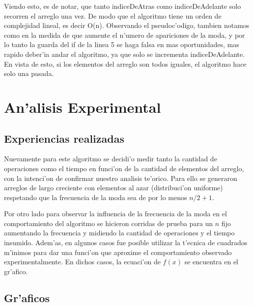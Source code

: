 Viendo esto, es de notar, que tanto indiceDeAtras como indiceDeAdelante solo recorren el arreglo una vez. De modo que el algoritmo tiene un orden de complejidad lineal, es decir O(n).
Observando el pseudoc'odigo, tambien notamos como en la medida de que aumente el n'umero de apariciones de la moda, y por lo tanto la guarda del if de la linea 5 se haga falsa en mas oportunidades, mas rapido deber'ia andar el algoritmo, ya que solo se incrementa indiceDeAdelante. En vista de esto, si los elementos del arreglo son todos iguales, el algoritmo hace solo una pasada.

\section{An'alisis Experimental}
\subsection{Experiencias realizadas}
Nuevamente para este algoritmo se decidi'o medir tanto la cantidad de operaciones como el tiempo en funci'on de la cantidad de 
elementos del arreglo, con la intenci'on de confirmar nuestro analisis te'orico. Para ello se generaron arreglos de largo creciente 
con elementos al azar (distribuci'on uniforme) respetando que la frecuencia de la moda sea de por lo menos $n/2+1$.

Por otro lado para observar la influencia de la frecuencia de la moda en el comportamiento del algoritmo se hicieron corridas de prueba
para un $n$ fijo aumentando la frecuencia y midiendo la cantidad de operaciones y el tiempo insumido.
Adem'as, en algunos casos fue posible utilizar la t'ecnica de cuadrados m'inimos para dar una funci'on 
que aproxime el comportamiento observado experimentalmente. En dichos casos, la ecuaci'on de $f(x)$ se encuentra en el gr'afico.

\subsection{Gr'aficos}

